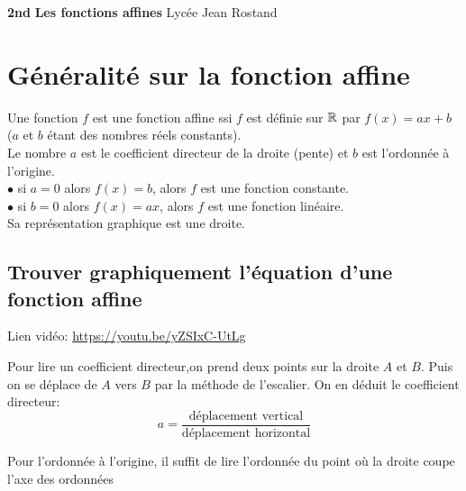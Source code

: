 \documentclass[12pt,a4paper]{article}
\begin{document}
\textbf{2nd} \hfill \textbf{Les fonctions affines} \hfill Lycée Jean Rostand\\
\trait 

\section{Généralité sur la fonction affine}



\begin{defi}



Une fonction $f$ est une fonction affine ssi $f$ est définie sur $\mathbb{R}$ par $f(x)=ax+b$\\ ($a$ et $b$ étant des nombres réels constants).\\
Le nombre $a$ est le coefficient directeur de la droite (pente) et $b$ est l'ordonnée à l'origine.\\
$\bullet$ si $a=0$ alors $f(x)=b$, alors $f$ est une fonction constante.\medskip\\
$\bullet$ si $b=0$ alors $f(x)=ax$, alors $f$ est une fonction linéaire.\medskip\\
Sa  représentation graphique est une droite.


\end{defi}

\subsection{Trouver graphiquement l'équation d'une fonction affine}

\begin{minipage}{0.85\textwidth}
Lien vidéo:
\url{https://youtu.be/yZSIxC-UtLg}
\end{minipage}
\begin{minipage}{0.2\textwidth}
\end{minipage}


Pour lire un coefficient directeur,on prend deux points sur la droite $A$ et $B$. Puis on se déplace de $A$ vers $B$ par la méthode de l'escalier. On en déduit le coefficient directeur:
$$\boxed{a=\dfrac{\text{déplacement vertical}}{\text{déplacement horizontal}}}$$

Pour l'ordonnée à l'origine, il suffit de lire l'ordonnée du point où la droite coupe l'axe des ordonnées
\end{document}
